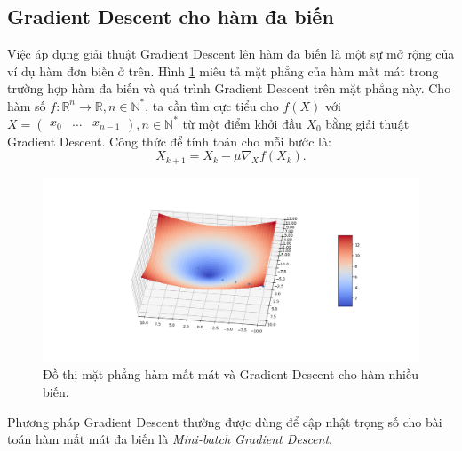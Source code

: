 \subsection{Gradient Descent cho hàm đa biến}
Việc áp dụng giải thuật Gradient Descent lên hàm đa biến là một sự mở rộng của ví dụ hàm đơn biến ở trên. Hình \ref{fig:3dgradient_descent} miêu tả mặt phẳng của hàm mất mát trong trường hợp hàm đa biến và quá trình Gradient Descent trên mặt phẳng này. Cho hàm số $f:{{\mathbb{R}}^n}{\rightarrow}{\mathbb{R}}, n{\in}{\mathbb{N}}^*$, ta cần tìm cực tiểu cho $f(X)$ với $X=\begin{pmatrix}x_0 & ... & x_{n-1}\end{pmatrix}, n{\in}{\mathbb{N}}^*$ từ một điểm khởi đầu $X_0$ bằng giải thuật Gradient Descent. Công thức để tính toán cho mỗi bước là:
\begin{equation}
	X_{k+1}=X_{k}-{\mu}{{\nabla}_X}f\left(X_{k}\right).
\end{equation}
\begin{figure}[ht!]
	\centerline{\includegraphics[scale=0.5]{images/3dgradient_descent.png}}
  	\caption{Đồ thị mặt phẳng hàm mất mát và Gradient Descent cho hàm nhiều biến.}
  	\label{fig:3dgradient_descent}
\end{figure}

Phương pháp Gradient Descent thường được dùng để cập nhật trọng số cho bài toán hàm mất mát đa biến là \emph{Mini-batch Gradient Descent}.

